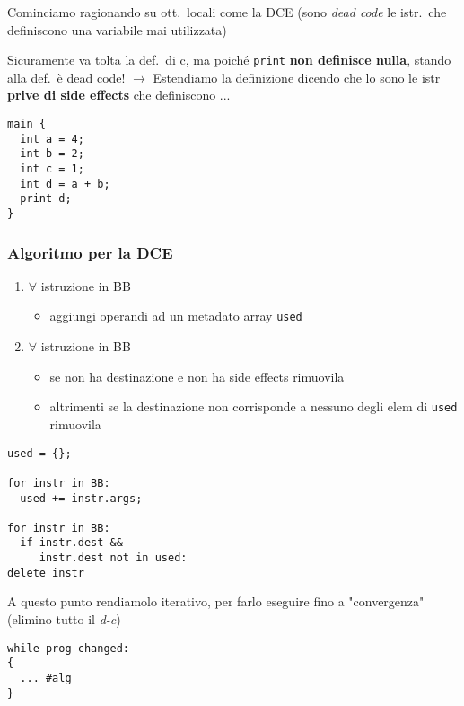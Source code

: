 Cominciamo ragionando su ott.~locali come la DCE (sono \textit{dead code} le istr.~che definiscono una variabile mai utilizzata)

\noindent\begin{minipage}[b]{.65\textwidth}
  Sicuramente va tolta la def.~di c, ma poich\'e \lstinline|print| \textbf{non definisce nulla}, stando alla def.~\`e dead code! $\rightarrow$ Estendiamo la definizione dicendo che lo sono le istr \textbf{prive di side effects} che definiscono ... 
\end{minipage}\hfill
\begin{minipage}[c]{.3\textwidth}
  \begin{lstlisting}
main {
  int a = 4;
  int b = 2;
  int c = 1;
  int d = a + b;
  print d;
}\end{lstlisting}
\end{minipage}

\subsubsection{Algoritmo per la DCE}

\begin{enumerate}
  \item $\forall$ istruzione in BB
    \begin{itemize}
      \item aggiungi operandi ad un metadato array \lstinline|used|
    \end{itemize}
  \item $\forall$ istruzione in BB
    \begin{itemize}
      \item se non ha destinazione e non ha side effects rimuovila
      \item altrimenti se la destinazione non corrisponde a nessuno degli elem di \lstinline|used| rimuovila
    \end{itemize} 
\end{enumerate}

\begin{lstlisting}
used = {};

for instr in BB:
  used += instr.args;

for instr in BB:
  if instr.dest &&
     instr.dest not in used:
delete instr\end{lstlisting}

A questo punto rendiamolo iterativo, per farlo eseguire fino a "convergenza" (elimino tutto il \textit{d-c})

\begin{lstlisting}
while prog changed:
{
  ... #alg
}\end{lstlisting}

